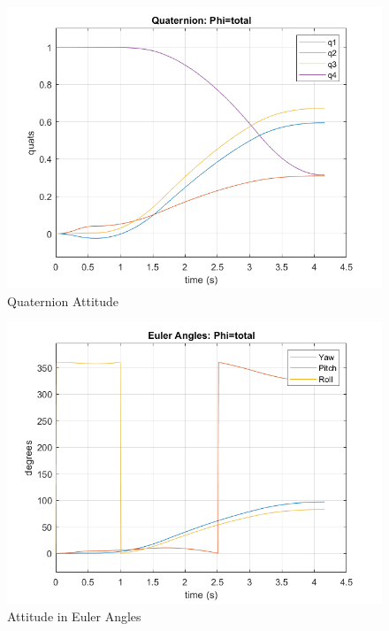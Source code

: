 \documentclass[letterpaper, preprint, paper,11pt]{AAS}	%
\begin{document}
			\begin{figure}[H]
				\label{fig:quats_phi_total_alpha0}
				\begin{center}
					\includegraphics[width=4.5in]{figures/alpha0/quats.png}
				\end{center}
				\caption{Quaternion Attitude}
			\end{figure}
			
			\begin{figure}[H]
				\label{fig:euler_ang_phi_total_alpha0}
				\begin{center}
					\includegraphics[width=4.5in]{figures/alpha0/euler_angles.png}
				\end{center}
				\caption{Attitude in Euler Angles}
			\end{figure}
			
\end{document}
